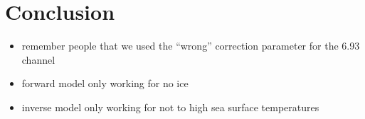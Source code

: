 \documentclass[11pt, a4paper]{article}
\begin{document}

\clearpage
\section{Conclusion}

\begin{itemize}
\item remember people that we used the ``wrong'' correction parameter for the 6.93 channel
\item forward model only working for no ice
\item inverse model only working for not to high sea surface temperatures
\end{itemize}
\end{document}
